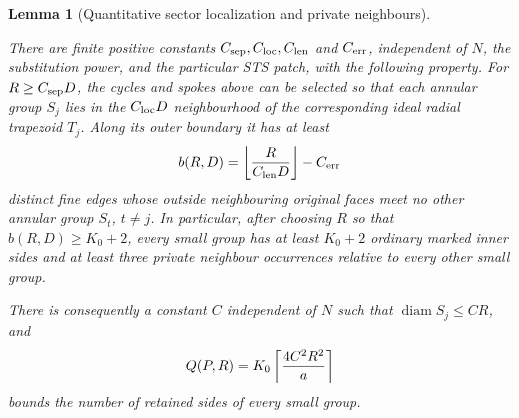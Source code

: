 \documentclass[11pt,a4paper]{article}
\newtheorem{lemma}[definition]{Lemma}
\theoremstyle{remark}
\newcommand{\lean}[1]{}
\newcommand{\uses}[1]{}
\begin{document}
\begin{lemma}[Quantitative sector localization and private neighbours]
\label{lem:quantitative-sector}
\lean{Tilings.Geometry.quantitativeAnnularGrouping}
\uses{def:mesh,lem:regular-grouping,lem:outside-grouping,lem:annular-spokes}
There are finite positive constants $C_{\rm sep},C_{\rm loc},C_{\rm len}$
and $C_{\rm err}$, independent of $N$, the substitution power, and the
particular STS patch, with the following property.  For
$R\ge C_{\rm sep}D$, the cycles and spokes above can be selected so that
each annular group $S_j$ lies in the $C_{\rm loc}D$ neighbourhood of the
corresponding ideal radial trapezoid $T_j$.  Along its outer boundary it
has at least
\[
 b(R,D)=\left\lfloor {R\over C_{\rm len}D}\right\rfloor-C_{\rm err}
\]
distinct fine edges whose outside neighbouring original faces meet no
other annular group $S_t$, $t\ne j$.  In particular, after choosing $R$
so that $b(R,D)\ge K_0+2$, every small group has at least $K_0+2$ ordinary
marked inner sides and at least three private neighbour occurrences
relative to every other small group.

There is consequently a constant $C$ independent of $N$ such that
$\operatorname{diam}S_j\le CR$, and
\[
 Q(P,R)=K_0\left\lceil {4C^2R^2\over a}\right\rceil
\]
bounds the number of retained sides of every small group.
\end{lemma}
\end{document}
